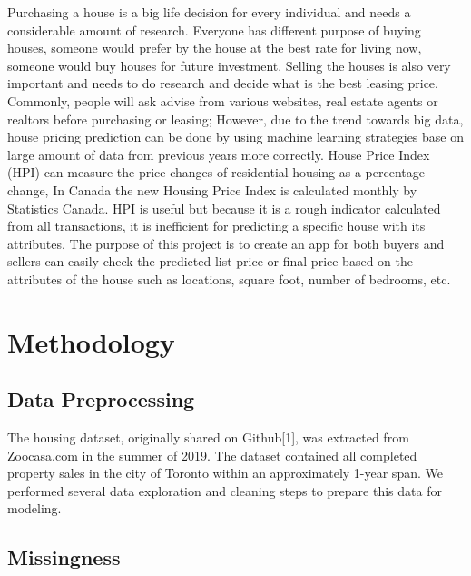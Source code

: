 \documentclass[11pt,]{article}
\begin{document}
Purchasing a house is a big life decision for every individual and needs
a considerable amount of research. Everyone has different purpose of
buying houses, someone would prefer by the house at the best rate for
living now, someone would buy houses for future investment. Selling the
houses is also very important and needs to do research and decide what
is the best leasing price. Commonly, people will ask advise from various
websites, real estate agents or realtors before purchasing or leasing;
However, due to the trend towards big data, house pricing prediction can
be done by using machine learning strategies base on large amount of
data from previous years more correctly. House Price Index (HPI) can
measure the price changes of residential housing as a percentage change,
In Canada the new Housing Price Index is calculated monthly by
Statistics Canada. HPI is useful but because it is a rough indicator
calculated from all transactions, it is inefficient for predicting a
specific house with its attributes. The purpose of this project is to
create an app for both buyers and sellers can easily check the predicted
list price or final price based on the attributes of the house such as
locations, square foot, number of bedrooms, etc.

\hypertarget{methodology}{%
\section{Methodology}\label{methodology}}

\hypertarget{data-preprocessing}{%
\subsection{Data Preprocessing}\label{data-preprocessing}}

The housing dataset, originally shared on Github{[}1{]}, was extracted
from Zoocasa.com in the summer of 2019. The dataset contained all
completed property sales in the city of Toronto within an approximately
1-year span. We performed several data exploration and cleaning steps to
prepare this data for modeling.

\hypertarget{missingness}{%
\subsection{Missingness}\label{missingness}}
\end{document}
